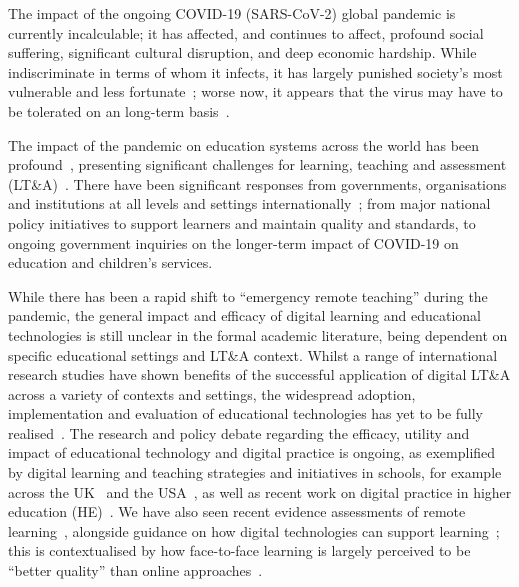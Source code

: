 \documentclass[conference]{IEEEtran}
\begin{document}
The impact of the ongoing COVID-19 (SARS-CoV-2) global pandemic is
currently incalculable; it has affected, and continues to affect,
profound social suffering, significant cultural disruption, and deep
economic hardship. While indiscriminate in terms of whom it infects,
it has largely punished society’s most vulnerable and less
fortunate~\cite{vonbraun-et-al:2020,lancetcovid:2020,vanlancker+parolin:2020};
worse now, it appears that the virus may have to be tolerated on an
long-term basis~\cite{kissler-et-al:2020}.

The impact of the pandemic on education systems across the world has
been profound~\cite{unescocovidedu:2020,armitage+nellums:2020},
presenting significant challenges for learning, teaching and
assessment (LT\&A)~\cite{doucet-et-al:2020,oecd:2020,aace:2020}. There
have been significant responses from governments, organisations and
institutions at all levels and settings
internationally~\cite{who:2020}; from major national policy
initiatives to support learners and maintain quality and standards, to
ongoing government inquiries on the longer-term impact of COVID-19 on
education and children’s services.


While there has been a rapid shift to ``emergency remote teaching''
during the pandemic, the general impact and efficacy of digital
learning and educational technologies is still unclear in the formal
academic literature, being dependent on specific educational settings
and LT\&A context. Whilst a range of international research studies
have shown benefits of the successful application of digital LT\&A
across a variety of contexts and settings, the widespread adoption,
implementation and evaluation of educational technologies has yet to
be fully
realised~\cite{decodinglearning:2012,means:2014,ecjrc:2017,mayer:2018}.
The research and policy debate regarding the efficacy, utility and
impact of educational technology and digital practice is ongoing, as
exemplified by digital learning and teaching strategies and
initiatives in schools, for example across the
UK~\cite{digscot:2016,dfe:2019} and the USA~\cite{usdoe:2020}, as well
as recent work on digital practice in higher education
(HE)~\cite{jisc:2020,wef:2020}. We have also seen recent evidence
assessments of remote learning~\cite{eefremote:2020}, alongside
guidance on how digital technologies can support
learning~\cite{eefdigtech:2019}; this is contextualised by how
face-to-face learning is largely perceived to be ``better quality''
than online approaches~\cite{paechter+maier:ihe2010,scbbcnews:2020}.
\end{document}
